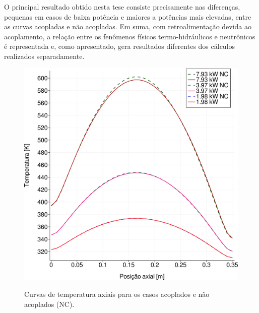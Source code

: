 O principal resultado obtido nesta tese consiste precisamente nas diferenças,
pequenas em casos de baixa potência e maiores a potências mais elevadas, entre as curvas acopladas e não acopladas.
Em suma, com retroalimentação devida ao acoplamento, a relação entre os fenômenos
físicos termo-hidráulicos e neutrônicos é representada e, como apresentado,
gera resultados diferentes dos cálculos realizados separadamente.


\begin{figure}[htb]
  \caption{Curvas de temperatura axiais para os casos acoplados e não acoplados (NC).}
  \centering\includegraphics[scale=0.5]{figuras/T_z_all_square_port.png}
  \label{fig:T_all_z}
\end{figure}

